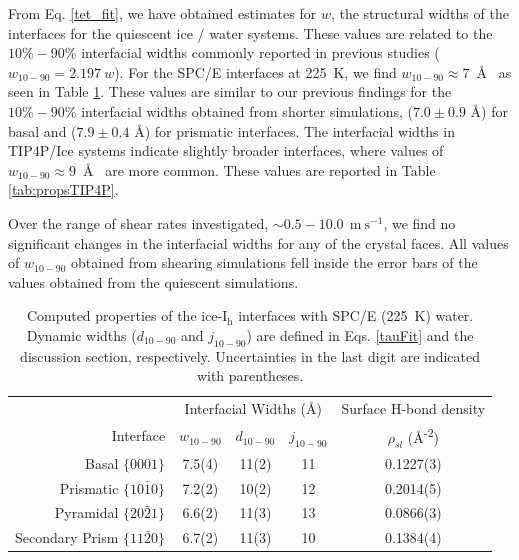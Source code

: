 From Eq. \eqref{tet_fit}, we have obtained estimates for $w$, the
structural widths of the interfaces for the quiescent ice / water
systems. These values are related to the $10\%-90\%$ interfacial
widths commonly reported in previous studies
($w_\mathrm{10-90} = 2.197~w$).\cite{Bryk2002,Bryk2004} For the SPC/E
interfaces at 225~K, we find $w_\mathrm{10-90} \approx 7$~\AA~ as seen
in Table \ref{tab:propsSPCE}.  These values are similar to our previous
findings for the $10\%-90\%$ interfacial widths obtained from shorter
simulations, ($7.0 \pm 0.9$ \AA) for basal and ($7.9 \pm 0.4$ \AA) for
prismatic interfaces.\cite{Louden2013a} The interfacial widths in
TIP4P/Ice systems indicate slightly broader interfaces, where values of
$w_\mathrm{10-90} \approx 9$~\AA~ are more common. These values are
reported in Table \ref{tab:propsTIP4P}.

Over the range of shear rates investigated,
$\sim 0.5-10.0~\mathrm{~m~s}^{-1}$, we find no significant changes in
the interfacial widths for any of the crystal faces. All values of
$w_\mathrm{10-90}$ obtained from shearing simulations fell inside the
error bars of the values obtained from the quiescent simulations.

\begin{table}[h]
\centering
\caption{Computed properties of the
  ice-I$_\mathrm{h}$ interfaces with SPC/E (225~K)
  water. Dynamic widths ($d_\mathrm{10-90}$ and $j_\mathrm{10-90}$)
  are defined in Eqs. \eqref{tauFit} and the discussion section,
  respectively. Uncertainties in the last digit are indicated with
  parentheses.\label{tab:propsSPCE}} 
\begin{tabular}{r|ccc|c}  
  \toprule
  & \multicolumn{3}{c|}{Interfacial Widths (\AA)} & Surface H-bond density \\
  Interface & $w_\mathrm{10-90}$ &  $d_\mathrm{10-90}$ & $j_\mathrm{10-90}$ & $\rho_{sl}$ (\AA\textsuperscript{-2}) \\ 
  \midrule
  Basal  $\{0001\}$                 & 7.5(4) & 11(2) & 11 & 0.1227(3)  \\
  Prismatic  $\{10\bar{1}0\}$       & 7.2(2) & 10(2) & 12 & 0.2014(5)  \\
  Pyramidal  $\{20\bar{2}1\}$       & 6.6(2) & 11(3) & 13 & 0.0866(3)  \\
  Secondary Prism  $\{11\bar{2}0\}$ & 6.7(2) & 11(3) & 10 & 0.1384(4)  \\ 
  \bottomrule
\end{tabular}
\end{table}

